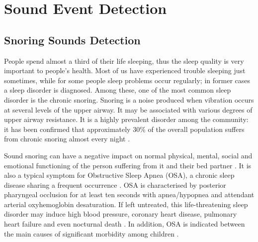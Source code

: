 \chapter{Sound Event Detection}

\section{Snoring Sounds Detection}

People spend almost a third of their life sleeping, thus the sleep quality is very important to people's health. Most of us  have experienced trouble sleeping just sometimes, while for some people sleep problems occur regularly; in former cases a sleep disorder is diagnosed. Among these, one of the most common sleep disorder \cite{sleep-disorders} is the chronic snoring.
Snoring is a noise produced when vibration occurs at several levels of the upper airway. It may be associated with various degrees of upper airway resistance. It is a highly prevalent disorder among the community: it has been confirmed that approximately 30\% of the overall population suffers from chronic snoring almost every night \cite{young1997nasal}.

Sound snoring can have a negative impact on normal physical, mental, social and emotional functioning of the person suffering from it and their bed partner \cite{blumen2012snoring}.  It is also a typical symptom for Obstructive Sleep Apnea (OSA), a chronic sleep disease sharing a frequent occurrence \cite{strollo1996obstructive}. 
OSA is characterised by posterior pharyngeal occlusion for at least ten seconds with apnea/hypopnea and attendant arterial oxyhemoglobin desaturation. If left untreated, this life-threatening sleep disorder may induce high blood pressure, coronary heart disease, pulmonary heart failure and even nocturnal death \cite{banno2007sleep}. In addition, OSA is indicated between the main causes of significant morbidity among children \cite{lumeng2008epidemiology}.

